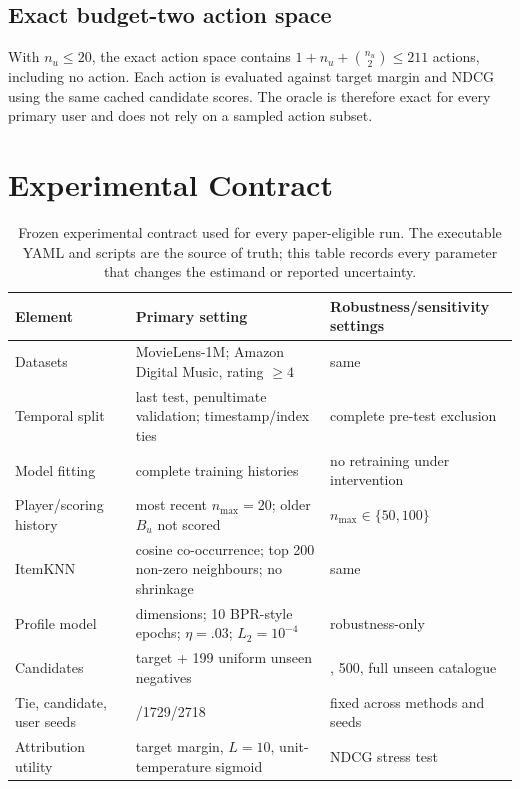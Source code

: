 \documentclass[pdflatex,sn-mathphys-num]{sn-jnl}
\theoremstyle{thmstyleone}
\theoremstyle{thmstyletwo}
\theoremstyle{thmstylethree}
\begin{document}
\subsection{Exact budget-two action space}
With $n_u\le20$, the exact action space contains $1+n_u+\binom{n_u}{2}\le211$ actions, including no action. Each action is evaluated against target margin and NDCG using the same cached candidate scores. The oracle is therefore exact for every primary user and does not rely on a sampled action subset.

\FloatBarrier
\clearpage
\section{Experimental Contract}\label{app:contract}
\setcounter{table}{0}

\begin{table}[!htbp]
\centering\scriptsize
\setlength{\tabcolsep}{3pt}
\caption{Frozen experimental contract used for every paper-eligible run. The executable YAML and scripts are the source of truth; this table records every parameter that changes the estimand or reported uncertainty.}
\label{tab:app-contract}
\begin{tabular}{@{}>{\raggedright\arraybackslash}p{}>{\raggedright\arraybackslash}p{}>{\raggedright\arraybackslash}p{}@{}}
\toprule
Element & Primary setting & Robustness/sensitivity settings\\
\midrule
Datasets & MovieLens-1M; Amazon Digital Music, rating $\ge4$ & same\\
Temporal split & last test, penultimate validation; timestamp/index ties & complete pre-test exclusion\\
Model fitting & complete training histories & no retraining under intervention\\
Player/scoring history & most recent $n_{\max}=20$; older $B_u$ not scored & $n_{\max}\in\{50,100\}$\\
ItemKNN & cosine co-occurrence; top 200 non-zero neighbours; no shrinkage & same\\
Profile model & 64 dimensions; 10 BPR-style epochs; $\eta=.03$; $L_2=10^{-4}$ & robustness-only\\
Candidates & target + 199 uniform unseen negatives & 100, 500, full unseen catalogue\\
Tie, candidate, user seeds & 31415/1729/2718 & fixed across methods and seeds\\
Attribution utility & target margin, $L=10$, unit-temperature sigmoid & NDCG stress test\\

\end{tabular}
\end{table}
\end{document}
